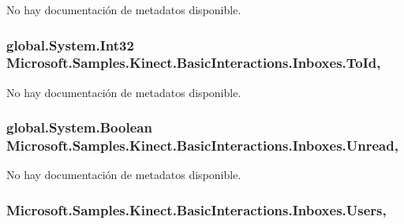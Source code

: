 No hay documentación de metadatos disponible. 

\hypertarget{class_microsoft_1_1_samples_1_1_kinect_1_1_basic_interactions_1_1_inboxes_a864dee98e466744a59027d73178247cf}{
\subsubsection[{To\-Id}]{\setlength{\rightskip}{0pt plus 5cm}global.\-System.\-Int32 Microsoft.\-Samples.\-Kinect.\-Basic\-Interactions.\-Inboxes.\-To\-Id\hspace{0.3cm}{\ttfamily [get]}, {\ttfamily [set]}}}\label{class_microsoft_1_1_samples_1_1_kinect_1_1_basic_interactions_1_1_inboxes_a864dee98e466744a59027d73178247cf}


No hay documentación de metadatos disponible. 

\hypertarget{class_microsoft_1_1_samples_1_1_kinect_1_1_basic_interactions_1_1_inboxes_a7f3876341272c5589bcd87e5f722fa2e}{
\subsubsection[{Unread}]{\setlength{\rightskip}{0pt plus 5cm}global.\-System.\-Boolean Microsoft.\-Samples.\-Kinect.\-Basic\-Interactions.\-Inboxes.\-Unread\hspace{0.3cm}{\ttfamily [get]}, {\ttfamily [set]}}}\label{class_microsoft_1_1_samples_1_1_kinect_1_1_basic_interactions_1_1_inboxes_a7f3876341272c5589bcd87e5f722fa2e}


No hay documentación de metadatos disponible. 

\hypertarget{class_microsoft_1_1_samples_1_1_kinect_1_1_basic_interactions_1_1_inboxes_ad8f9920839070567baff9073d0cec2e4}{
\subsubsection[{Users}]{ Microsoft.\-Samples.\-Kinect.\-Basic\-Interactions.\-Inboxes.\-Users\hspace{0.3cm}{\ttfamily [get]}, {\ttfamily [set]}}}\label{class_microsoft_1_1_samples_1_1_kinect_1_1_basic_interactions_1_1_inboxes_ad8f9920839070567baff9073d0cec2e4}


